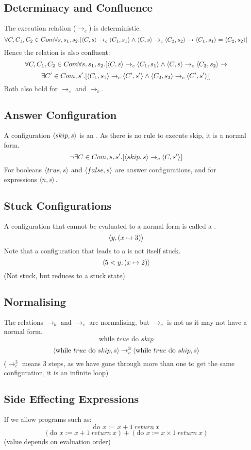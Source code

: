 \documentclass{report}
\begin{document}
\subsection*{Determinacy and Confluence}
The execution relation ($\to_c$) is deterministic.
\[\forall C,C_1,C_2 \in Com \forall s,s_1,s_2 .[\langle C, s \rangle \to_c \langle C_1, s_1 \rangle \land \langle C, s \rangle \to_c \langle C_2, s_2 \rangle \rightarrow \langle C_1, s_1 \rangle = \langle C_2, s_2 \rangle]\]
Hence the relation is also confluent:
\[\forall C,C_1,C_2 \in Com \forall s,s_1,s_2 .[\langle C, s \rangle \to_c \langle C_1, s_1 \rangle \land \langle C, s \rangle \to_c \langle C_2, s_2 \rangle \rightarrow \]
			\[\exists C' \in Com, s' . [\langle C_1, s_1 \rangle \to_c \langle C', s' \rangle \land \langle C_2, s_2 \rangle\to_c \langle C', s' \rangle ]]\]
Both also hold for $\to_e$ and $\to_b$.
\subsection*{Answer Configuration}
A configuration $\langle skip, s \rangle$ is an . As there is no rule to execute skip, it is a normal form.
\[\neg\exists C \in Com, s, s' . [\langle skip, s \rangle \to_c \langle C, s' \rangle]\]
For booleans $\langle true, s \rangle$ and $\langle false, s \rangle$ are answer configurations, and for expressions $\langle n, s \rangle$.
\subsection*{Stuck Configurations}
A configuration that cannot be evaluated to a normal form is called a .
\[\langle y, (x \mapsto 3) \rangle\]
Note that a configuration that leads to a  is not itself stuck.
\[\langle 5 < y, (x \mapsto 2) \rangle\]
(Not stuck, but reduces to a stuck state)
\subsection*{Normalising}
The relations $\to_b$ and $\to_e$ are normalising, but $\to_c$ is not as it may not have a normal form.
\[\text{while } true \text{ do } skip\]
\[\langle \text{while } true \text{ do } skip, s \rangle \to_c^3 \langle \text{while } true \text{ do } skip, s \rangle\]
($\to_c^3$ means 3 steps, as we have gone through more than one to get the same configuration, it is an infinite loop)
\subsection*{Side Effecting Expressions}
If we allow programs such as:
\[\text{do } x := x + 1 \ return \ x\]
\[(\text{do } x := x + 1 \ return \ x) + (\text{do } x := x \times 1 \ return \ x)\]
(value depends on evaluation order)
\end{document}
